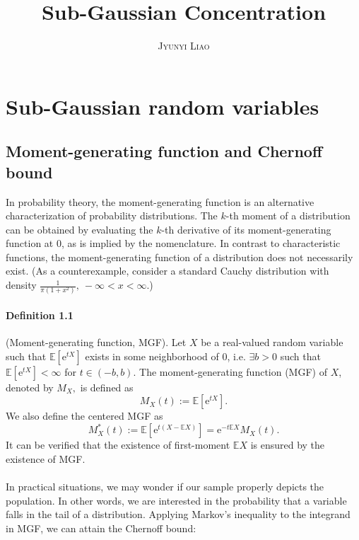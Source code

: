 \documentclass{article}
\title{\bf Sub-Gaussian Concentration}
\author{\textsc{Jyunyi Liao}}
\date{}
\newcommand{\E}{\mathbb{E}}
\begin{document}
\maketitle
\section{Sub-Gaussian random variables}
\subsection{Moment-generating function and Chernoff bound}
In probability theory, the moment-generating function is an alternative characterization of probability distributions. The $k$-th moment of a distribution can be obtained by evaluating the $k$-th derivative of its moment-generating function at 0, as is implied by the nomenclature. In contrast to characteristic functions, the moment-generating function of a distribution does not necessarily exist. (As a counterexample, consider a standard Cauchy distribution with density $\frac{1}{\pi(1+x^2)},\ -\infty < x < \infty$.)

\paragraph{Definition 1.1} (Moment-generating function, MGF). Let $X$ be a real-valued random variable such that $\E[\mathrm{e}^{tX}]$ exists in some neighborhood of $0$, i.e. $\exists b>0$ such that $\E[\mathrm{e}^{tX}] < \infty$ for $t\in(-b,b).$ The moment-generating function (MGF) of $X$, denoted by $M_X,$ is defined as
\begin{equation*}
	M_X(t) := \E[\mathrm{e}^{tX}].\tag{1.1}
\end{equation*}
We also define the centered MGF as
\begin{equation*}
	M_X^*(t) := \E[\mathrm{e}^{t(X - \E X)}] = \mathrm{e}^{-t\E X}M_X(t).\tag{1.2}
\end{equation*}
It can be verified that the existence of first-moment $\E X$ is ensured by the existence of MGF.

\paragraph{} In practical situations, we may wonder if our sample properly depicts the population. In other words, we are interested in the probability that a variable falls in the tail of a distribution. Applying Markov's inequality to the integrand in MGF, we can attain the Chernoff bound:
\end{document}
